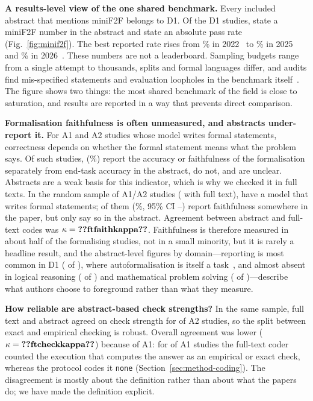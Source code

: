 \textbf{A results-level view of the one shared benchmark.} Every included abstract that mentions miniF2F belongs to D1. Of the  D1 studies,  state a miniF2F number in the abstract and  state an absolute pass rate (Fig.~\ref{fig:minif2f}). The best reported rate rises from \% in 2022~\cite{wu2022autoformalization} to \% in 2025~\cite{ospanov2025apollo} and \% in 2026~\cite{varambally2026hilbert}. These numbers are not a leaderboard. Sampling budgets range from a single attempt to thousands, splits and formal languages differ, and audits find mis-specified statements and evaluation loopholes in the benchmark itself~\cite{ospanov2025minif2f,ammanamanchi2026faults}. The figure shows two things: the most shared benchmark of the field is close to saturation, and results are reported in a way that prevents direct comparison.

\textbf{Formalisation faithfulness is often unmeasured, and abstracts under-report it.} For A1 and A2 studies whose model writes formal statements, correctness depends on whether the formal statement means what the problem says. Of  such studies,  (\%) report the accuracy or faithfulness of the formalisation separately from end-task accuracy in the abstract,  do not, and  are unclear. Abstracts are a weak basis for this indicator, which is why we checked it in full texts. In the random sample of  A1/A2 studies ( with full text),  have a model that writes formal statements;  of them (\%, 95\% CI --) report faithfulness somewhere in the paper, but only  say so in the abstract. Agreement between abstract and full-text codes was $\kappa=\cnt{ftfaithkappa}$. Faithfulness is therefore measured in about half of the formalising studies, not in a small minority, but it is rarely a headline result, and the abstract-level figures by domain---reporting is most common in D1 ( of ), where autoformalisation is itself a task~\cite{li2024autoformalize,liu2025rethinking,chen2026reform}, and almost absent in logical reasoning ( of ) and mathematical problem solving ( of )---describe what authors choose to foreground rather than what they measure.

\textbf{How reliable are abstract-based check strengths?} In the same sample, full text and abstract agreed on check strength for  of  A2 studies, so the split between exact and empirical checking is robust. Overall agreement was lower ($\kappa=\cnt{ftcheckkappa}$) because of A1: for  of  A1 studies the full-text coder counted the execution that computes the answer as an empirical or exact check, whereas the protocol codes it \texttt{none} (Section~\ref{sec:method-coding}). The disagreement is mostly about the definition rather than about what the papers do; we have made the definition explicit.

